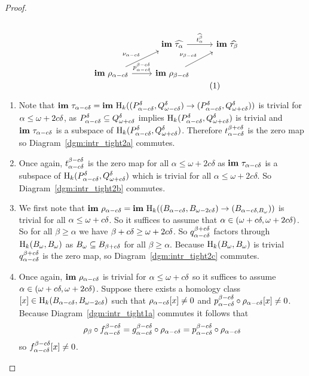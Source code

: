 \begin{proof}
\begin{scriptsize}
\begin{subequations}
\begin{minipage}{0.45\textwidth}
  \begin{equation}\label{dgm:intr_tight2d}\begin{tikzcd}
    & |[alias=Fa]|
    \im~\ext{\tau_\alpha}  \arrow[to=Fb, "\ext{t_\alpha^\beta}"]
    & |[alias=Fb]|
      \im~\ext{\tau_\beta}\\
    \im~\rho_{\alpha-c\of}  \arrow[to=Gb, "p_{\alpha-c\of}^{\beta-c\of}"]
                      \arrow[to=Fa, "\nu_{\alpha-c\of}"]
    & |[alias=Gb]|
      \im~\rho_{\beta - c\of} \arrow[to=Fb, "\nu_{\beta-c\of}"]&
  \end{tikzcd}\end{equation}
  \end{minipage}
  \end{subequations}
  \end{scriptsize}
  \vspace{3ex}

  \begin{enumerate}[label=\Roman*.]
    \item Note that $\mathbf{im}~\tau_{\alpha-c{\delta}} = \mathbf{im}~\mathrm{H}_k((P^{{\delta}}_{\alpha-c{\delta}}, Q_{\omega - c{\delta}}^{\delta})\to (P^{{\delta}}_{\alpha-c{\delta}}, Q_{\omega + c{\delta}}^{\delta}))$ is trivial for $\alpha\leq \omega+2c{\delta}$, as
    $P^{{\delta}}_{\alpha-c{\delta}}\subseteq Q_{\omega + c{\delta}}^{\delta}$ implies $\mathrm{H}_k(P^{{\delta}}_{\alpha-c{\delta}}, Q_{\omega + c{\delta}}^{\delta})$ is trivial and $\mathbf{im}~\tau_{\alpha-c{\delta}}$ is a subspace of $\mathrm{H}_k(P^{{\delta}}_{\alpha-c{\delta}}, Q_{\omega + c{\delta}}^{\delta})$.
    Therefore $t_{\alpha-c{\delta}}^{\beta+c{\delta}}$ is the zero map so Diagram~\ref{dgm:intr_tight2a} commutes.
    \item Once again, $t_{\alpha-c{\delta}}^{\beta-c{\delta}}$ is the zero map for all $\alpha\leq\omega+2c\delta$ as $\mathbf{im}~\tau_{\alpha-c{\delta}}$ is a subspace of $\mathrm{H}_k(P^{{\delta}}_{\alpha-c{\delta}}, Q_{\omega + c{\delta}}^{\delta})$ which is trivial for all $\alpha\leq\omega+2c\delta$.
    So Diagram~\ref{dgm:intr_tight2b} commutes.
    \item We first note that $\mathbf{im}~\rho_{\alpha-c{\delta}} = \mathbf{im}~\mathrm{H}_k((B_{\alpha-c{\delta}}, B_{\omega - 2c{\delta}})\to (B_{\alpha-c{\delta}, B_{\omega}}))$ is trivial for all $\alpha\leq \omega+c{\delta}$.
    So it suffices to assume that $\alpha\in (\omega+c{\delta}, \omega+2c{\delta})$.
    So for all $\beta\geq\alpha$ we have $\beta+c{\delta}\geq\omega+2c{\delta}$.
    So $q_{\alpha-c{\delta}}^{\beta+c{\delta}}$ factors through $\mathrm{H}_k(B_{\omega}, B_{\omega})$ as $B_{\omega}\subseteq B_{\beta+c{\delta}}$ for all $\beta\geq\alpha$.
    Because $\mathrm{H}_k(B_{\omega}, B_{\omega})$ is trivial $q_{\alpha-c{\delta}}^{\beta+c{\delta}}$ is the zero map, so Diagram~\ref{dgm:intr_tight2c} commutes.
    \item Once again, $\mathbf{im}~\rho_{\alpha-c{\delta}}$ is trivial for $\alpha\leq\omega+c{\delta}$ so it suffices to assume $\alpha\in (\omega+c{\delta}, \omega+2c{\delta})$.
    Suppose there exists a homology class $[x]\in\mathrm{H}_k(B_{\alpha-c{\delta}}, B_{\omega - 2c{\delta}})$ such that $\rho_{\alpha-c{\delta}}[x]\neq 0$ and $p_{\alpha-c{\delta}}^{\beta-c{\delta}}\circ\rho_{\alpha-c{\delta}}[x]\neq 0$.
    Because Diagram~\ref{dgm:intr_tight1a} commutes it follows that
    \[\rho_\beta\circ f_{\alpha-c{\delta}}^{\beta-c{\delta}} = g_{\alpha-c{\delta}}^{\beta-c{\delta}}\circ\rho_{\alpha-c{\delta}} = p_{\alpha-c{\delta}}^{\beta-c{\delta}}\circ\rho_{\alpha-c{\delta}}\]
    so $f_{\alpha - c{\delta}}^{\beta-c{\delta}}[x]\neq 0$.


\end{enumerate}
\end{proof}
